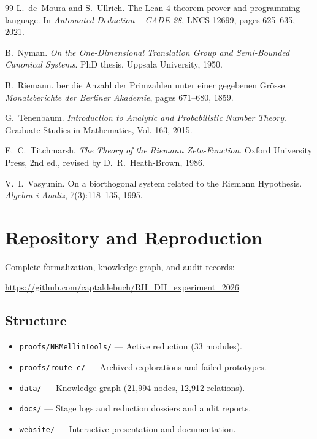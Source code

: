\documentclass[11pt,a4paper]{article}
\theoremstyle{plain}
\theoremstyle{definition}
\theoremstyle{remark}
\begin{document}
\begin{thebibliography}{99}
L.~de~Moura and S.~Ullrich.
\newblock The {L}ean 4 theorem prover and programming language.
\newblock In \emph{Automated Deduction -- CADE 28}, LNCS 12699, pages 625--635, 2021.

B.~Nyman.
\newblock \emph{On the One-Dimensional Translation Group and Semi-Bounded Canonical Systems}.
\newblock PhD thesis, Uppsala University, 1950.

B.~Riemann.
ber die {A}nzahl der {P}rimzahlen unter einer gegebenen {G}r{\"o}sse.
\newblock \emph{Monatsberichte der Berliner Akademie}, pages 671--680, 1859.

G.~Tenenbaum.
\newblock \emph{Introduction to Analytic and Probabilistic Number Theory}.
\newblock Graduate Studies in Mathematics, Vol. 163, 2015.

E.~C.~Titchmarsh.
\newblock \emph{The Theory of the Riemann Zeta-Function}.
\newblock Oxford University Press, 2nd ed., revised by D.~R.~Heath-Brown, 1986.

V.~I.~Vasyunin.
\newblock On a biorthogonal system related to the {R}iemann {H}ypothesis.
\newblock \emph{Algebra i Analiz}, 7(3):118--135, 1995.

\end{thebibliography}

\appendix
\section{Repository and Reproduction}
\label{sec:appendix}

Complete formalization, knowledge graph, and audit records:
\begin{center}
\url{https://github.com/captaldebuch/RH_DH_experiment_2026}
\end{center}

\subsection{Structure}
\begin{itemize}[leftmargin=2em]
  \item \texttt{proofs/NBMellinTools/} --- Active reduction (33 modules).
  \item \texttt{proofs/route-c/} --- Archived explorations and failed prototypes.
  \item \texttt{data/} --- Knowledge graph (21,994 nodes, 12,912 relations).
  \item \texttt{docs/} --- Stage logs and reduction dossiers and audit reports.
  \item \texttt{website/} --- Interactive presentation and documentation.
\end{itemize}
\end{document}
